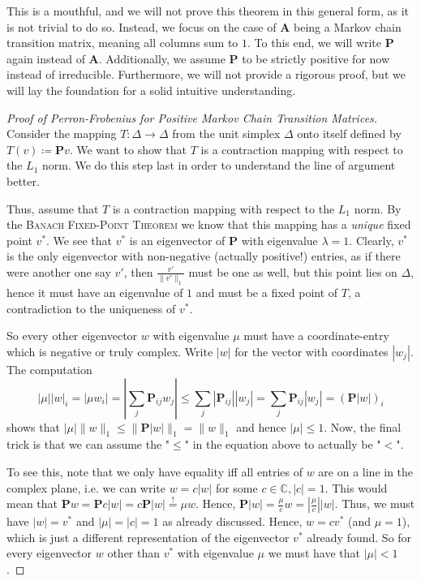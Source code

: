 \documentclass[../../main.tex]{subfiles}
\begin{document}
This is a mouthful, and we will not prove this theorem in this general form, as it is not trivial to do so. Instead, we focus on the case of $\bm{A}$ being a Markov chain transition matrix, meaning all columns sum to $1$. To this end, we will write $\bm{P}$ again instead of $\bm{A}$. Additionally, we assume $\bm{P}$ to be strictly positive for now instead of irreducible. Furthermore, we will not provide a rigorous proof, but we will lay the foundation for a solid intuitive understanding.

\begin{proof}[Proof of Perron-Frobenius for Positive Markov Chain Transition Matrices]
    ~\\
    Consider the mapping $T: \Delta \to \Delta$ from the unit simplex $\Delta$ onto itself defined by $T(v) \coloneqq \bm{P} v$. We want to show that $T$ is a contraction mapping with respect to the $L_1$ norm. We do this step last in order to understand the line of argument better.
    
    Thus, assume that $T$ is a contraction mapping with respect to the $L_1$ norm. By the \textsc{Banach Fixed-Point Theorem} we know that this mapping has a \emph{unique} fixed point $v^*$. We see that $v^*$ is an eigenvector of $\bm{P}$ with eigenvalue $\lambda = 1$. Clearly, $v^*$ is the only eigenvector with non-negative (actually positive!) entries, as if there were another one say $v'$, then $\frac{v'}{\|v'\|_1}$ must be one as well, but this point lies on $\Delta$, hence it must have an eigenvalue of $1$ and must be a fixed point of $T$, a contradiction to the uniqueness of $v^*$.

    So every other eigenvector $w$ with eigenvalue $\mu$ must have a coordinate-entry which is negative or truly complex. Write $|w|$ for the vector with coordinates $|w_j|$. The computation
    \[
        |\mu||w|_i = |\mu w_i| = |\sum_{j} \bm{P}_{ij} w_j| \leq \sum_{j} |\bm{P}_{ij}| |w_j| = \sum_{j} \bm{P}_{ij} |w_j| = (\bm{P} |w|)_i
    \]
    shows that $|\mu| \|w\|_1 \leq \|\bm{P} |w|\|_1 = \|w\|_1$ and hence $|\mu| \leq 1$. Now, the final trick is that we can assume the "$\leq$" in the equation above to actually be "$<$".

    To see this, note that we only have equality iff all entries of $w$ are on a line in the complex plane, i.e. we can write $w = c |w|$ for some $c \in \mathbb{C}, |c| = 1$. This would mean that $\bm{P} w = \bm{P} c |w| = c \bm{P} |w| \overset{!}{=} \mu w$. Hence, $\bm{P} |w| = \frac{\mu}{c} w = |\frac{\mu}{c}| |w|$. Thus, we must have $|w| = v^*$ and $|\mu| = |c| = 1$ as already discussed. Hence, $w = c v^*$ (and $\mu = 1$), which is just a different representation of the eigenvector $v^*$ already found. So for every eigenvector $w$ other than $v^*$ with eigenvalue $\mu$ we must have that $|\mu| < 1$.


\end{proof}
\end{document}
